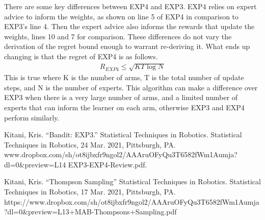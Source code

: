 \documentclass[11pt]{article}
\begin{document}
There are some key differences between EXP4 and EXP3. EXP4 relies on expert advice to inform the weights, as shown on line 5 of EXP4 in comparison to EXP3's line 4. Then the expert advice also informs the rewards that update the weights, lines 10 and 7 for comparison. These differences do not vary the derivation of the regret bound enough to warrant re-deriving it. What ends up changing is that the regret of EXP4 is as follows.
\begin{align}
    R_{EXP4}\leq \sqrt{KT\log N}\label{eq:EXP4regretbound}
\end{align}
This is true where K is the number of arms, T is the total number of update steps, and N is the number of experts. This algorithm can make a difference over EXP3 when there is a very large number of arms, and a limited number of experts that can inform the learner on each arm, otherwise EXP3 and EXP4 perform similarly.

{
\begin{thebibliography}{9}
Kitani, Kris. “Bandit: EXP3.” Statistical Techniques in Robotics. Statistical Techniques in Robotics, 24 Mar. 2021, Pittsburgh, PA. www.dropbox.com/sh/ot8ijbxfr9ngol2/AAAruOFyQu3T6582fWm1Aumja?dl=0&preview=L14 EXP3-EXP4-Review.pdf.

Kitani, Kris. “Thompson Sampling” Statistical Techniques in Robotics. Statistical Techniques in Robotics, 17 Mar. 2021, Pittsburgh, PA. https://www.dropbox.com/sh/ot8ijbxfr9ngol2/AAAruOFyQu3T6582fWm1Aumja?dl=0&preview=L13+MAB-Thompsons+Sampling.pdf
\end{thebibliography}
}


\end{document}
